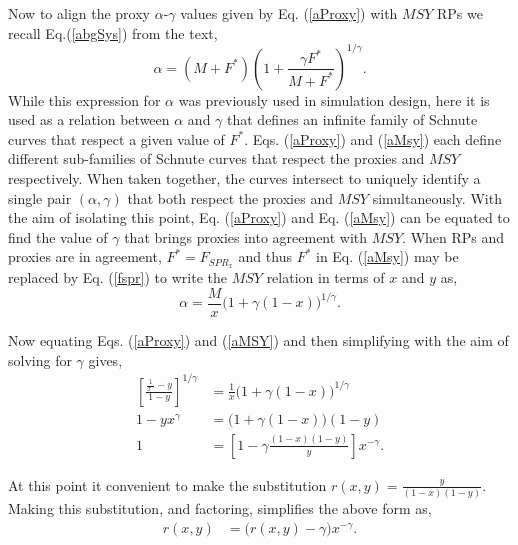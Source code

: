 %
Now to align the proxy $\alpha$-$\gamma$ values given by Eq. (\ref{aProxy}) 
with $MSY$ RPs we recall Eq.(\ref{abgSys}) from the text,
\begin{equation}
\alpha = (M+F^*)\left(1+\frac{\gamma F^*}{M+F^*}\right)^{1/\gamma}. \label{aMsy}
\end{equation}
While this expression for $\alpha$ was previously used in simulation design, 
here it is used as a relation between $\alpha$ and $\gamma$ that defines an 
infinite family of Schnute curves that respect a given value of $F^*$. 
Eqs. (\ref{aProxy}) and (\ref{aMsy}) each define different sub-families of 
Schnute curves that respect the proxies and $MSY$ respectively. When taken together,
the curves intersect to uniquely identify a single pair $(\alpha, \gamma)$ that
both respect the proxies and $MSY$ simultaneously. With the aim of isolating this point, 
Eq. (\ref{aProxy}) and Eq. (\ref{aMsy}) can be equated to find the 
value of $\gamma$ that brings proxies into agreement with $MSY$. When RPs and 
proxies are in agreement, $F^*=F_{SPR_x}$ and thus $F^*$ in Eq. (\ref{aMsy})  
may be replaced by Eq. (\ref{fspr}) to write the $MSY$ relation in terms of $x$ and $y$ as, 
\begin{equation}
\alpha = \frac{M}{x}\Big(1+\gamma(1-x)\Big)^{1/\gamma} \label{aMSY}.
\end{equation}
 


%
Now equating Eqs. (\ref{aProxy}) and (\ref{aMSY}) and then simplifying with the aim of solving for $\gamma$ gives,
%
\begin{align*}
\left[ \frac{\frac{1}{x^\gamma}-y}{1-y} \right]^{1/\gamma} &= \frac{1}{x}\Big(1+\gamma(1-x)\Big)^{1/\gamma}\\
1-yx^\gamma &= \Big(1+\gamma(1-x)\Big)(1-y)\\
1 &= \left[ 1-\gamma\frac{(1-x)(1-y)}{y}\right]x^{-\gamma}.
\end{align*}

%
At this point it convenient to make the substitution $r(x,y)=\frac{y}{(1-x)(1-y)}$. Making this substitution, 
and factoring, simplifies the above form as,
%
\begin{align}
r(x,y)&=\Big(r(x,y)-\gamma\Big)x^{-\gamma}.
\end{align}

